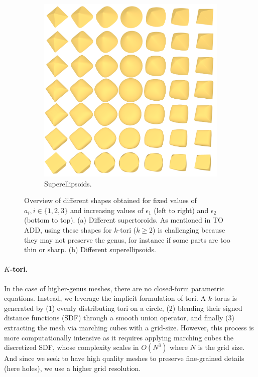 \begin{figure}[t]
\begin{subfigure}[t]{0.48\linewidth}
    \includegraphics[width=\linewidth]{figs/topogen/ellipsoids_overview.png}
    \caption{Superellipsoids.}
    \label{fig:ellipsoids-overview}
  \end{subfigure}
  \caption{Overview of different shapes obtained for fixed values of $a_i, i \in \{1, 2, 3\}$ and increasing values of $\epsilon_1$ (left to right) and $\epsilon_2$ (bottom to top). 
  (a) Different supertoroids. As mentioned in TO ADD, using these shapes for $k$-tori ($k \geq 2$) is challenging because they may not preserve the genus, for instance if some parts are too thin or sharp. 
  (b) Different superellipsoids.}
  \label{fig:overview}
\end{figure}

\paragraph{$K$-tori.} In the case of higher-genus meshes, there are no closed-form parametric equations. Instead, we leverage the implicit formulation of tori. A $k$-torus is generated by (1) evenly distributing tori on a circle, (2) blending their signed distance functions (SDF) through a smooth union operator, and finally (3) extracting the mesh via marching cubes with a grid-size. However, this process is more computationally intensive as it requires applying marching cubes the discretized SDF, whose complexity scales in $O(N^3)$ where $N$ is the grid size. And since we seek to have high quality meshes to preserve fine-grained details (here holes), we use a higher grid resolution.

